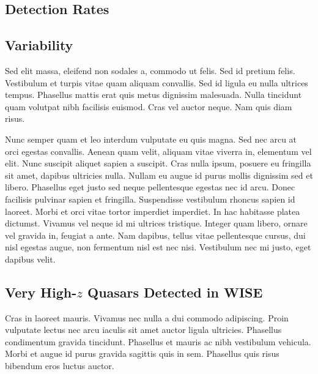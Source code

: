 \documentclass[usenatbib]{mnras}
\begin{document}
\subsection{Detection Rates}

\subsection{Variability}
Sed elit massa, eleifend non sodales a, commodo ut felis. Sed id pretium felis. Vestibulum et turpis vitae quam aliquam convallis. Sed id ligula eu nulla ultrices tempus. Phasellus mattis erat quis metus dignissim malesuada. Nulla tincidunt quam volutpat nibh facilisis euismod. Cras vel auctor neque. Nam quis diam risus.

Nunc semper quam et leo interdum vulputate eu quis magna. Sed nec arcu at orci egestas convallis. Aenean quam velit, aliquam vitae viverra in, elementum vel elit. Nunc suscipit aliquet sapien a suscipit. Cras nulla ipsum, posuere eu fringilla sit amet, dapibus ultricies nulla. Nullam eu augue id purus mollis dignissim sed et libero. Phasellus eget justo sed neque pellentesque egestas nec id arcu. Donec facilisis pulvinar sapien et fringilla. Suspendisse vestibulum rhoncus sapien id laoreet. Morbi et orci vitae tortor imperdiet imperdiet. In hac habitasse platea dictumst. Vivamus vel neque id mi ultrices tristique. Integer quam libero, ornare vel gravida in, feugiat a ante. Nam dapibus, tellus vitae pellentesque cursus, dui nisl egestas augue, non fermentum nisl est nec nisi. Vestibulum nec mi justo, eget dapibus velit.


\subsection{Very High-$z$ Quasars Detected in WISE}
\citet{Blain2013} 
Cras in laoreet mauris. Vivamus nec nulla a dui commodo adipiscing. Proin vulputate lectus nec arcu iaculis sit amet auctor ligula ultricies. Phasellus condimentum gravida tincidunt. Phasellus et mauris ac nibh vestibulum vehicula. Morbi et augue id purus gravida sagittis quis in sem. Phasellus quis risus bibendum eros luctus auctor.
\end{document}
